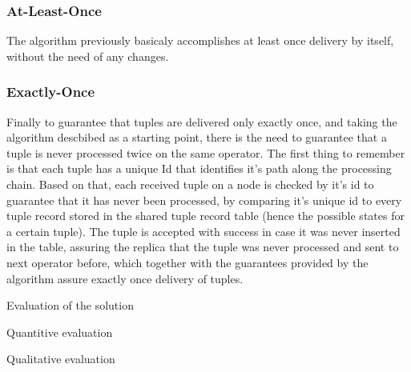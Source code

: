 \documentclass[times, 10pt,twocolumn]{article}
\newcommand{\forceindent}{\leavevmode{\parindent=1em\indent}}
\begin{document}
\subsubsection{At-Least-Once}

\forceindent The algorithm previously basicaly accomplishes at least once
delivery by itself, without the need of any changes. 

\subsubsection{Exactly-Once}

\forceindent Finally to guarantee that tuples are delivered only exactly
once, and taking the algorithm descbibed as a starting point, there is the
need to guarantee that a tuple is never processed twice on the same
operator. The first thing to remember is that each tuple has a unique Id
that identifies it's path along the processing chain. Based on that, each
received tuple on a node is checked by it's id to guarantee that it has
never been processed, by comparing it's unique id to every tuple record
stored in the shared tuple record table (hence the possible states for a
certain tuple).  The tuple is accepted with success in case it was never
inserted in the table, assuring the replica that the tuple was never
processed and sent to next operator before, which together with the
guarantees provided by the algorithm assure exactly once delivery of
tuples.


Evaluation of the solution


Quantitive evaluation


Qualitative evaluation

\end{document}
